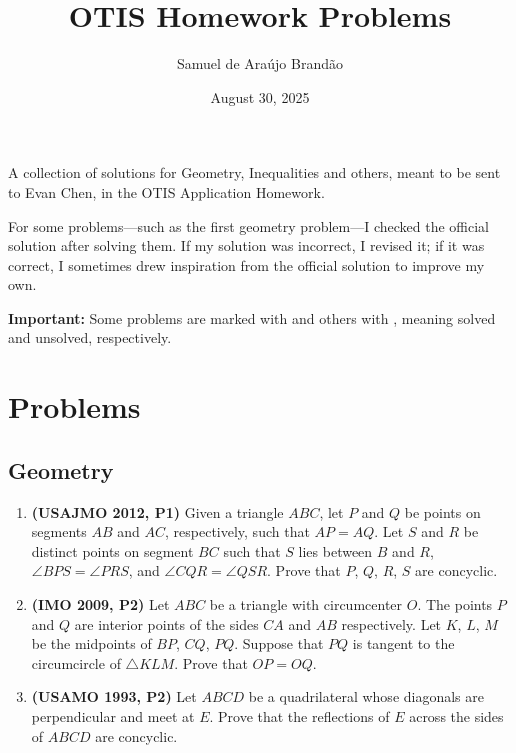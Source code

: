 \documentclass[12pt]{article}
\title{\sffamily\bfseries{OTIS Homework Problems}}
\author{Samuel de Araújo Brandão}
\date{August 30, 2025}
\newcommand{\cmark}{\textcolor{color5}{\ding{51}}} %
\newcommand{\xmark}{\textcolor{color6}{\ding{55}}}   %
\begin{document}
  \maketitle

  A collection of solutions for Geometry, Inequalities and others, meant to be sent to Evan Chen, in the OTIS Application Homework.

  For some problems—such as the first geometry problem—I checked the official solution after solving them. If my solution was incorrect, I 
  revised it; if it was correct, I sometimes drew inspiration from the official solution to improve my own. 

  \textbf{\textcolor{color6}{Important:}} Some problems are marked with \cmark and others with \xmark, meaning solved and unsolved, respectively.

  \tableofcontents
  
  \clearpage
  
  \section{\textsf{Problems}}
    \subsection{Geometry}
      \begin{enumerate}[label=\textbf{A.\arabic*.}]
        \item \textbf{\textcolor{color2}{(USAJMO 2012, P1)}} \cmark \quad  Given a triangle $ABC$, let $P$ and $Q$ be points on segments $AB$ and $AC$, respectively, such
          that $AP = AQ$. Let $S$ and $R$ be distinct points on segment $BC$ such that $S$ lies between $B$ and $R$, $\angle BPS = \angle PRS$,
          and $\angle CQR = \angle QSR$. Prove that $P$, $Q$, $R$, $S$ are concyclic.

        \item \textbf{\textcolor{color2}{(IMO 2009, P2)}} \cmark \quad Let $ABC$ be a triangle with circumcenter $O$. The points $P$ and $Q$ are interior points of the sides $CA$
          and $AB$ respectively. Let $K$, $L$, $M$ be the midpoints of $BP$, $CQ$, $PQ$. Suppose that $PQ$ is tangent to the circumcircle 
          of $\triangle KLM$. Prove that $OP = OQ$.

        \item \textbf{\textcolor{color2}{(USAMO 1993, P2)}} \xmark \quad Let $ABCD$ be a quadrilateral whose diagonals are perpendicular and meet at $E$. Prove that the reflections
          of $E$ across the sides of $ABCD$ are concyclic.
      \end{enumerate}
\end{document}
